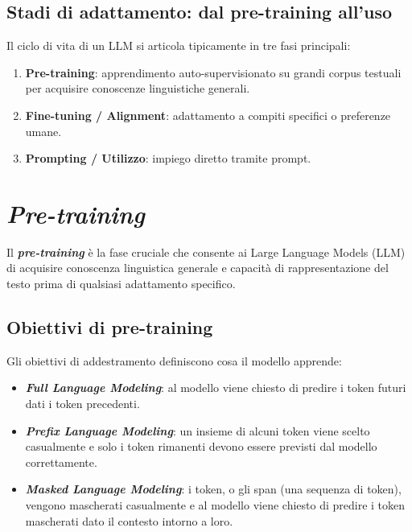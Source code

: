 \subsection{Stadi di adattamento: dal pre-training all'uso}
Il ciclo di vita di un LLM si articola tipicamente in tre fasi principali:
\begin{enumerate}
    \item \textbf{Pre-training}: apprendimento auto-supervisionato su grandi corpus testuali per acquisire conoscenze linguistiche generali.
    \item \textbf{Fine-tuning / Alignment}: adattamento a compiti specifici o preferenze umane.
    \item \textbf{Prompting / Utilizzo}: impiego diretto tramite prompt.
\end{enumerate}

\newpage
\section{\textit{Pre-training}}

Il \textbf{\textit{pre-training}} è la fase cruciale che consente ai Large Language Models (LLM) di acquisire conoscenza linguistica generale e capacità di 
rappresentazione del testo prima di qualsiasi adattamento specifico.

\subsection{Obiettivi di pre-training}
Gli obiettivi di addestramento definiscono cosa il modello apprende:
\begin{itemize}
    \item \textbf{\textit{Full Language Modeling}}: al modello viene chiesto di predire i token futuri dati i token precedenti.
    \item \textbf{\textit{Prefix Language Modeling}}: un insieme di alcuni token viene scelto casualmente e solo i token rimanenti
    devono essere previsti dal modello correttamente.
    \item \textbf{\textit{Masked Language Modeling}}: i token, o gli span (una sequenza di token), vengono mascherati casualmente e al modello
    viene chiesto di predire i token mascherati dato il contesto intorno a loro.
    \cite{wang2022what}
\end{itemize}

